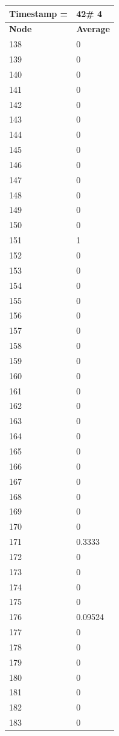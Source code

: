 \begin{tabular}{|l||l|}
\hline
\textbf{Timestamp =} & \textbf{42}\# 4\\\hline
	\textbf{Node} & \textbf{Average} \\ \hline
\hline
	138 & 0 \\ \hline
	139 & 0 \\ \hline
	140 & 0 \\ \hline
	141 & 0 \\ \hline
	142 & 0 \\ \hline
	143 & 0 \\ \hline
	144 & 0 \\ \hline
	145 & 0 \\ \hline
	146 & 0 \\ \hline
	147 & 0 \\ \hline
	148 & 0 \\ \hline
	149 & 0 \\ \hline
	150 & 0 \\ \hline
	151 & 1 \\ \hline
	152 & 0 \\ \hline
	153 & 0 \\ \hline
	154 & 0 \\ \hline
	155 & 0 \\ \hline
	156 & 0 \\ \hline
	157 & 0 \\ \hline
	158 & 0 \\ \hline
	159 & 0 \\ \hline
	160 & 0 \\ \hline
	161 & 0 \\ \hline
	162 & 0 \\ \hline
	163 & 0 \\ \hline
	164 & 0 \\ \hline
	165 & 0 \\ \hline
	166 & 0 \\ \hline
	167 & 0 \\ \hline
	168 & 0 \\ \hline
	169 & 0 \\ \hline
	170 & 0 \\ \hline
	171 & 0.3333 \\ \hline
	172 & 0 \\ \hline
	173 & 0 \\ \hline
	174 & 0 \\ \hline
	175 & 0 \\ \hline
	176 & 0.09524 \\ \hline
	177 & 0 \\ \hline
	178 & 0 \\ \hline
	179 & 0 \\ \hline
	180 & 0 \\ \hline
	181 & 0 \\ \hline
	182 & 0 \\ \hline
	183 & 0 \\ \hline
\end{tabular}
